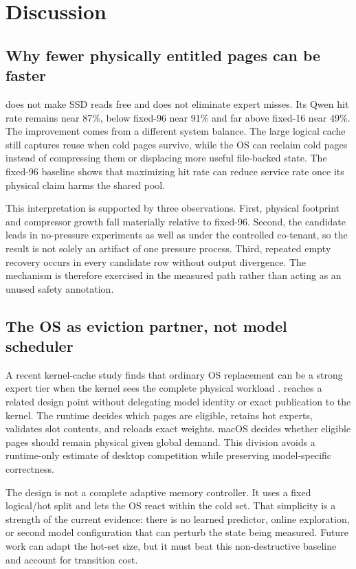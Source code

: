 \section{Discussion}
\label{sec:discussion}

\subsection{Why fewer physically entitled pages can be faster}

\system does not make SSD reads free and does not eliminate expert misses. Its
Qwen hit rate remains near 87\%, below fixed-96 near 91\% and far above
fixed-16 near 49\%. The improvement comes from a different system balance. The
large logical cache still captures reuse when cold pages survive, while the OS
can reclaim cold pages instead of compressing them or displacing more useful
file-backed state. The fixed-96 baseline shows that maximizing hit rate can
reduce service rate once its physical claim harms the shared pool.

This interpretation is supported by three observations. First, physical
footprint and compressor growth fall materially relative to fixed-96. Second,
the candidate leads in no-pressure experiments as well as under the controlled
co-tenant, so the result is not solely an artifact of one pressure process.
Third, repeated empty recovery occurs in every candidate row without output
divergence. The mechanism is therefore exercised in the measured path rather
than acting as an unused safety annotation.

\subsection{The OS as eviction partner, not model scheduler}

A recent kernel-cache study finds that ordinary OS replacement can be a strong
expert tier when the kernel sees the complete physical workload
\cite{si2026kernelcache}. \system reaches a related design point without
delegating model identity or exact publication to the kernel. The runtime
decides which pages are eligible, retains hot experts, validates slot contents,
and reloads exact weights. macOS decides whether eligible pages should remain
physical given global demand. This division avoids a runtime-only estimate of
desktop competition while preserving model-specific correctness.

The design is not a complete adaptive memory controller. It uses a fixed
logical/hot split and lets the OS react within the cold set. That simplicity is
a strength of the current evidence: there is no learned predictor, online
exploration, or second model configuration that can perturb the state being
measured. Future work can adapt the hot-set size, but it must beat this
non-destructive baseline and account for transition cost.

